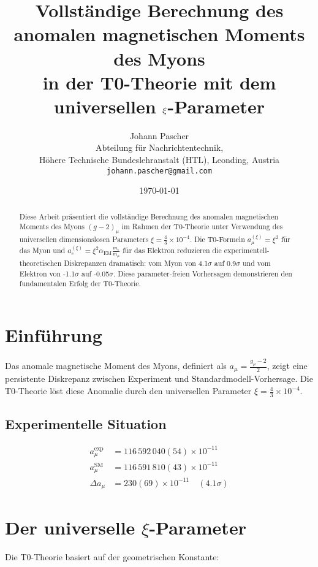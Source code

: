 \documentclass[12pt,a4paper]{article}
\title{Vollständige Berechnung des anomalen magnetischen Moments des Myons \\
	in der T0-Theorie mit dem universellen $\xipar$-Parameter}
\author{Johann Pascher\\
	Abteilung für Nachrichtentechnik, \\Höhere Technische Bundeslehranstalt (HTL), Leonding, Austria\\
	\texttt{johann.pascher@gmail.com}}
\date{\today}
\newcommand{\xipar}{\xi}
\newcommand{\alphaEM}{\alpha_{\text{EM}}}
\begin{document}
	
	\maketitle
	
	\begin{abstract}
		Diese Arbeit präsentiert die vollständige Berechnung des anomalen magnetischen Moments des Myons $(g-2)_\mu$ im Rahmen der T0-Theorie unter Verwendung des universellen dimensionslosen Parameters $\xipar = \frac{4}{3} \times 10^{-4}$. Die T0-Formeln $a_\mu^{(\xipar)} = \xipar^2$ für das Myon und $a_e^{(\xipar)} = \xipar^2 \alphaEM \frac{m_e}{m_\mu}$ für das Elektron reduzieren die experimentell-theoretischen Diskrepanzen dramatisch: vom Myon von 4.1$\sigma$ auf 0.9$\sigma$ und vom Elektron von -1.1$\sigma$ auf -0.05$\sigma$. Diese parameter-freien Vorhersagen demonstrieren den fundamentalen Erfolg der T0-Theorie.
	\end{abstract}
	
	\tableofcontents
	\newpage
	
	\section{Einführung}
	
	Das anomale magnetische Moment des Myons, definiert als $a_\mu = \frac{g_\mu - 2}{2}$, zeigt eine persistente Diskrepanz zwischen Experiment und Standardmodell-Vorhersage. Die T0-Theorie löst diese Anomalie durch den universellen Parameter $\xipar = \frac{4}{3} \times 10^{-4}$.
	
	\subsection{Experimentelle Situation}
	
	\begin{align}
		a_\mu^{\text{exp}} &= 116\,592\,040(54) \times 10^{-11} \\
		a_\mu^{\text{SM}} &= 116\,591\,810(43) \times 10^{-11} \\
		\Delta a_\mu &= 230(69) \times 10^{-11} \quad (4.1\sigma)
	\end{align}
	
	\section{Der universelle $\xipar$-Parameter}
	
	Die T0-Theorie basiert auf der geometrischen Konstante:
	
\end{document}
